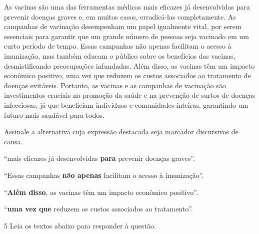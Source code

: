 \begin{myquote}
As vacinas são uma das ferramentas médicas mais eficazes já desenvolvidas para prevenir
doenças graves e, em muitos casos, erradicá-las completamente. As campanhas de
vacinação desempenham um papel igualmente vital, por serem essenciais para
garantir que um grande número de pessoas seja vacinado em um curto período de
tempo. Essas campanhas não apenas facilitam o acesso à imunização, mas também
educam o público sobre os benefícios das vacinas, desmistificando preocupações
infundadas. Além disso, as vacinas têm um impacto econômico positivo, uma vez
que reduzem os custos associados ao tratamento de doenças evitáveis. Portanto,
as vacinas e as campanhas de vacinação são investimentos cruciais na promoção
da saúde e na prevenção de surtos de doenças infecciosas, já que beneficiam
indivíduos e comunidades inteiras, garantindo um futuro mais saudável para
todos.


\end{myquote}

Assinale a alternativa cuja expressão destacada seja marcador discursivos de causa.

\begin{escolha}

    \item ``mais eficazes já desenvolvidas \textbf{para} prevenir doenças graves''.

    \item ``Essas campanhas \textbf{não apenas} facilitam o acesso à imunização''.

    \item ``\textbf{Além disso}, as vacinas têm um impacto econômico positivo''.

    \item ``\textbf{uma vez que} reduzem os custos associados ao tratamento''.

\end{escolha}

\num{5} Leia os textos abaixo para responder à questão. 


